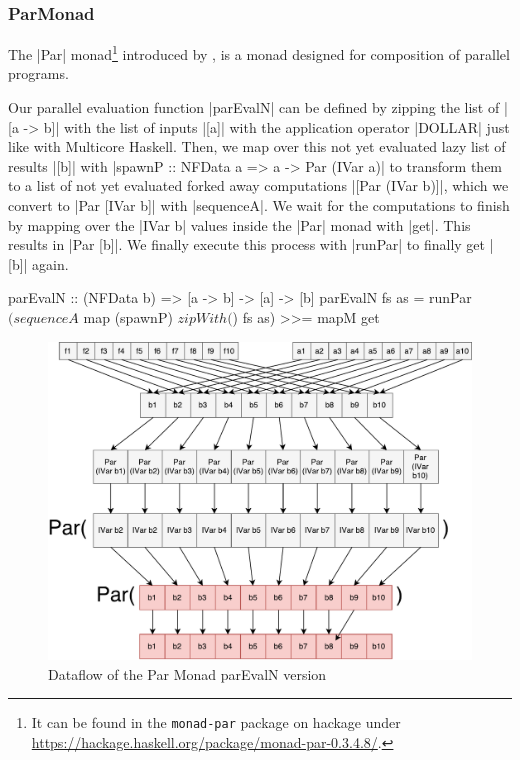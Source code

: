 \subsubsection{ParMonad}
The |Par| monad\footnote{It can be found in the \texttt{monad-par} package on hackage under \url{https://hackage.haskell.org/package/monad-par-0.3.4.8/}.} introduced by \citet{monad_par_paper_2011}, is a monad designed for composition of parallel programs.


Our parallel evaluation function |parEvalN| can be defined by zipping the list of |[a -> b]| with the list of inputs |[a]| with the application operator |DOLLAR| just like with Multicore Haskell. %
Then, we map over this not yet evaluated lazy list of results |[b]| with |spawnP :: NFData a => a -> Par (IVar a)| to transform them to a list of not yet evaluated forked away computations |[Par (IVar b)]|, which we convert to |Par [IVar b]| with |sequenceA|. We wait for the computations to finish by mapping over the |IVar b| values inside the |Par| monad with |get|. This results in |Par [b]|. We finally execute this process with |runPar| to finally get |[b]| again.


\begin{code}
parEvalN :: (NFData b) => [a -> b] -> [a] -> [b]
parEvalN fs as = runPar $ 
	(sequenceA $ map (spawnP) $ zipWith ($) fs as) >>= mapM get
\end{code}
\begin{figure}[h]
	\includegraphics[scale=0.5]{images/parEvalNParMonad}
	\caption{Dataflow of the Par Monad parEvalN version}
\end{figure}

